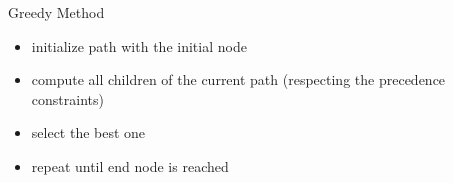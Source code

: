 \documentclass{beamer}
\begin{document}
\begin{frame}{Greedy Method}

	\begin{block}

		\begin{itemize}

			\item initialize path with the initial node
			\item compute all children of the current path (respecting the precedence constraints)
			\item select the best one
			\item repeat until end node is reached

		\end{itemize}

	\end{block}

\end{frame}
\end{document}

